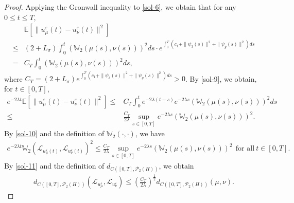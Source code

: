 \documentclass[11pt]{article}
\numberwithin{equation}{section}
\theoremstyle{plain}
\def\leq{\leqslant}
\begin{document}
\begin{proof}
 Applying the Gronwall inequality to \eqref{sol-6}, we
 obtain  that for any $0 \leq   t \leq T$,
\begin{align} \label{sol-9}
      & \mathbb{E}
          \left[ \| u_\mu^\varepsilon(t) - u_\nu^\varepsilon(t) \|^2
          \right]
           \nonumber \\
  \leq & (2 + L_\sigma) \int_0^t
                   \left( \mathbb{W}_2 \left( \mu(s), \nu(s) \right)
                   \right)^2
            ds \cdot
            e^{\int_0^T
                   \left( c_1
                          + \| \psi_3(s) \|^2
                          + \| \psi_g(s) \|^2
                   \right) ds
               }   \nonumber \\
     = & C_T \int_0^t
                   \left( \mathbb{W}_2 \left( \mu(s), \nu(s) \right)
                   \right)^2
            ds,
\end{align}
 where $C_T = (2 + L_\sigma)
             e^{\int_0^T
                   \left( c_1
                          + \| \psi_3(s) \|^2
                          + \| \psi_g(s) \|^2
                   \right) ds
               }
          > 0$.
  By \eqref{sol-9}, we obtain,
  for  $t \in [0,T]$,
\begin{align}\label{sol-10}
      e^{- 2\lambda t}
            \mathbb{E}
            \left[ \| u_\mu^\varepsilon(t) - u_\nu^\varepsilon(t) \|^2
            \right]
    \leq & C_T \int_0^t e^{- 2\lambda (t-s)} e^{- 2\lambda s}
                    \left( \mathbb{W}_2 \left( \mu(s), \nu(s) \right)
                    \right)^2
             ds  \nonumber \\
    \leq & \frac{C_T }{2\lambda} \sup_{s \in [0,T]} e^{-2\lambda s}
                    \left( \mathbb{W}_2 \left( \mu(s), \nu(s) \right)
                    \right)^2.
\end{align}
 By \eqref{sol-10} and the definition of $\mathbb{W}_2(\cdot,\cdot)$,
 we have
\begin{align}\label{sol-11}
            e^{- 2\lambda t}
              \mathbb{W}_2
                         \left( \mathcal{L}_{u_\mu^\varepsilon(t)}, \mathcal{L}_{u_\nu^\varepsilon(t)}
                         \right)^2
    \leq \frac{C_T }{2\lambda} \sup_{s \in [0,T]} e^{- 2\lambda s}
                    \left( \mathbb{W}_2 \left( \mu(s), \nu(s) \right)
                    \right)^2
                    \ \  \text{for all} \  t \in [0,T].
\end{align}
   By \eqref{sol-11} and the definition of $d_{C( [0,T], \mathcal{P}_2(H) )}$, we
   obtain
\begin{align}\label{sol-12}
          d_{C( [0,T], \mathcal{P}_2(H) )}
              \left( \mathcal{L}_{u_\mu^\varepsilon},
                     \mathcal{L}_{u_\nu^\varepsilon}
              \right)
    \leq  \left( \frac{C_T}{2\lambda} \right)^{\frac{1}{2}}
          d_{C( [0,T], \mathcal{P}_2(H) )} \left( \mu, \nu \right).
\end{align}



\end{proof}
\end{document}
